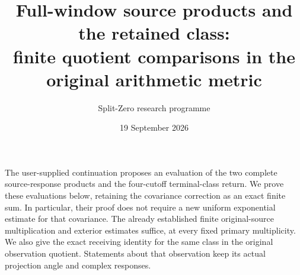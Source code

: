 \documentclass[11pt]{article}
\title{Full-window source products and the retained class:\\finite quotient comparisons in the original arithmetic metric}
\author{Split-Zero research programme}
\date{19 September 2026}
\begin{document}
\maketitle

The user-supplied continuation \cite{incoming} proposes an evaluation of the
two complete source-response products and the four-cutoff terminal-class
return. We prove these evaluations below, retaining the covariance correction
as an exact finite sum. In particular, their proof does not require a new
uniform exponential estimate for that covariance. The already established
finite original-source multiplication and exterior estimates suffice, at
every fixed primary multiplicity. We also give the exact receiving identity
for the same class in the original observation quotient. Statements about
that observation keep its actual projection angle and complex responses.
\end{document}
